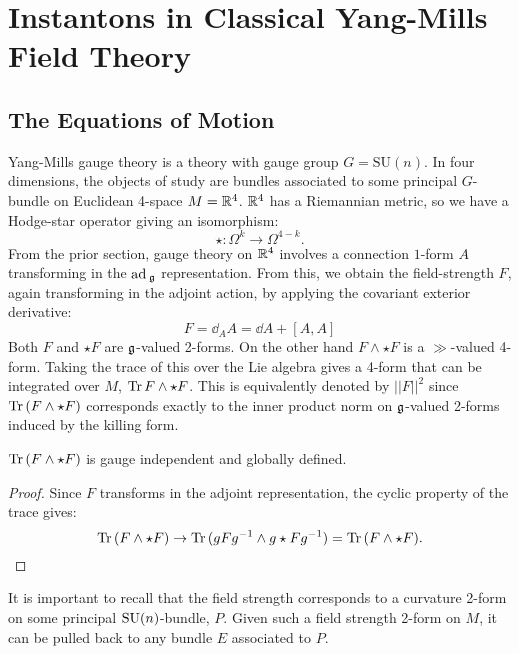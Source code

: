 \section{Instantons in Classical Yang-Mills Field Theory} %
\label{sec:instantons_in_classical_yang_mills_field_theory}

\subsection{The Equations of Motion} %
\label{sub:the_equations_of_motion}

Yang-Mills gauge theory is a theory with gauge group $G = \mathrm{SU}(n)$. In four dimensions, the objects of study are bundles associated to some principal $G$-bundle on Euclidean 4-space $M = \mathbb{R}^4$. $\mathbb{R}^4$ has a Riemannian metric, so we have a Hodge-star operator giving an isomorphism:
\[
	\star: \Omega^k \to \Omega^{4-k}.
\]
From the prior section, gauge theory on $\mathbb{R}^4$ involves a connection $1$-form $A$ transforming in the $\mathrm{ad}\,_\frak{g}$ representation. From this, we obtain the field-strength $F$, again transforming in the adjoint action, by applying the covariant exterior derivative:
\begin{equation}
	F = \dd_A A = \dd A + [A, A]
\end{equation}
Both $F$ and $\star F$ are $\frak g$-valued 2-forms. On the other hand $F \wedge \star F$ is a $\gg$-valued 4-form. Taking the trace of this over the Lie algebra gives a 4-form that can be integrated over $M$, $\mathrm{Tr}\, F \wedge \star F$. This is equivalently denoted by $||F||^2$ since $\mathrm{Tr}\, (F \wedge \star  F)$ corresponds exactly to the inner product norm on $\frak g$-valued 2-forms induced by the killing form.

\begin{prop}
	$\mathrm{Tr}\,(F \wedge \star F)$ is gauge independent and globally defined.
\end{prop}
\begin{proof}
	Since $F$ transforms in the adjoint representation, the cyclic property of the trace gives:
	\[
		\mathrm{Tr}\,(F \wedge \star F) \to \mathrm{Tr}\,(g F g^{-1} \wedge g \star F g^{-1}) = \mathrm{Tr}\,(F \wedge \star F).
	\]
\end{proof}
It is important to recall that the field strength corresponds to a curvature 2-form on some principal $\mathrm{SU}(n)$-bundle, $P$. Given such a field strength 2-form on $M$, it can be pulled back to any bundle $E$ associated to $P$. 

